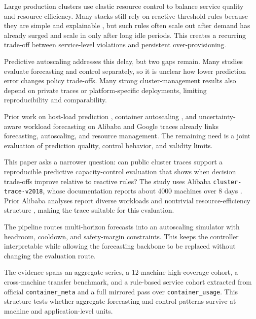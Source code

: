 Large production clusters use elastic resource control to balance service quality and resource efficiency. Many stacks still rely on reactive threshold rules because they are simple and explainable \citep{lorido2014review,Burns2016BorgKubernetes,Bernstein2014ContainersCloud}, but such rules often scale out after demand has already surged and scale in only after long idle periods. This creates a recurring trade-off between service-level violations and persistent over-provisioning.

Predictive autoscaling addresses this delay, but two gaps remain. Many studies evaluate forecasting and control separately, so it is unclear how lower prediction error changes policy trade-offs. Many strong cluster-management results also depend on private traces or platform-specific deployments, limiting reproducibility and comparability.

Prior work on host-load prediction \citep{Dinda2000HostLoad}, container autoscaling \citep{Casalicchio2019ContainerAutoscaling}, and uncertainty-aware workload forecasting on Alibaba and Google traces \citep{Rossi2025UncertaintyAwareForecasting} already links forecasting, autoscaling, and resource management. The remaining need is a joint evaluation of prediction quality, control behavior, and validity limits.

This paper asks a narrower question: can public cluster traces support a reproducible predictive capacity-control evaluation that shows when decision trade-offs improve relative to reactive rules? The study uses Alibaba \texttt{cluster-trace-v2018}, whose documentation reports about 4000 machines over 8 days \citep{alibabaclusterdata2026,alibabav2018trace}. Prior Alibaba analyses report diverse workloads and nontrivial resource-efficiency structure \citep{Jiang2022Characterizing,guo2019limits,luo2021characterizing}, making the trace suitable for this evaluation.

The pipeline routes multi-horizon forecasts into an autoscaling simulator with headroom, cooldown, and safety-margin constraints. This keeps the controller interpretable while allowing the forecasting backbone to be replaced without changing the evaluation route.

The evidence spans an aggregate series, a 12-machine high-coverage cohort, a cross-machine transfer benchmark, and a rule-based service cohort extracted from official \texttt{container\_meta} and a full mirrored pass over \texttt{container\_usage}. This structure tests whether aggregate forecasting and control patterns survive at machine and application-level units.

